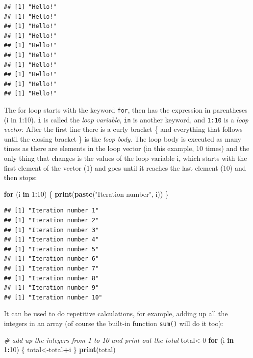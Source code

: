 \documentclass[
]{book}
\newenvironment{Shaded}{\begin{snugshade}}{\end{snugshade}}
\newcommand{\CommentTok}[1]{\textcolor[rgb]{0.56,0.35,0.01}{\textit{#1}}}
\newcommand{\ControlFlowTok}[1]{\textcolor[rgb]{0.13,0.29,0.53}{\textbf{#1}}}
\newcommand{\DecValTok}[1]{\textcolor[rgb]{0.00,0.00,0.81}{#1}}
\newcommand{\KeywordTok}[1]{\textcolor[rgb]{0.13,0.29,0.53}{\textbf{#1}}}
\newcommand{\NormalTok}[1]{#1}
\newcommand{\OperatorTok}[1]{\textcolor[rgb]{0.81,0.36,0.00}{\textbf{#1}}}
\newcommand{\StringTok}[1]{\textcolor[rgb]{0.31,0.60,0.02}{#1}}
\theoremstyle{definition}
\theoremstyle{definition}
\theoremstyle{definition}
\theoremstyle{remark}
\begin{document}
\begin{verbatim}
## [1] "Hello!"
## [1] "Hello!"
## [1] "Hello!"
## [1] "Hello!"
## [1] "Hello!"
## [1] "Hello!"
## [1] "Hello!"
## [1] "Hello!"
## [1] "Hello!"
## [1] "Hello!"
\end{verbatim}

The for loop starts with the keyword \texttt{for}, then has the expression in parentheses (i in 1:10). \texttt{i} is called the \emph{loop variable}, \texttt{in} is another keyword, and \texttt{1:10} is a \emph{loop vector}. After the first line there is a curly bracket \{ and everything that follows until the closing bracket \} is the \emph{loop body}. The loop body is executed as many times as there are elements in the loop vector (in this example, 10 times) and the only thing that changes is the values of the loop variable i, which starts with the first element of the vector (1) and goes until it reaches the last element (10) and then stops:

\begin{Shaded}
\begin{Highlighting}[]
\ControlFlowTok{for}\NormalTok{ (i }\ControlFlowTok{in} \DecValTok{1}\OperatorTok{:}\DecValTok{10}\NormalTok{) \{}
  \KeywordTok{print}\NormalTok{(}\KeywordTok{paste}\NormalTok{(}\StringTok{"Iteration number"}\NormalTok{, i))}
\NormalTok{\}}
\end{Highlighting}
\end{Shaded}

\begin{verbatim}
## [1] "Iteration number 1"
## [1] "Iteration number 2"
## [1] "Iteration number 3"
## [1] "Iteration number 4"
## [1] "Iteration number 5"
## [1] "Iteration number 6"
## [1] "Iteration number 7"
## [1] "Iteration number 8"
## [1] "Iteration number 9"
## [1] "Iteration number 10"
\end{verbatim}

It can be used to do repetitive calculations, for example, adding up all the integers in an array (of course the built-in function \texttt{sum()} will do it too):

\begin{Shaded}
\begin{Highlighting}[]
\CommentTok{\# add up the integers from 1 to 10 and print out the total}
\NormalTok{total\textless{}{-}}\DecValTok{0}
\ControlFlowTok{for}\NormalTok{ (i }\ControlFlowTok{in} \DecValTok{1}\OperatorTok{:}\DecValTok{10}\NormalTok{) \{}
\NormalTok{  total\textless{}{-}total}\OperatorTok{+}\NormalTok{i}
\NormalTok{\}}
\KeywordTok{print}\NormalTok{(total)}
\end{Highlighting}
\end{Shaded}
\end{document}
